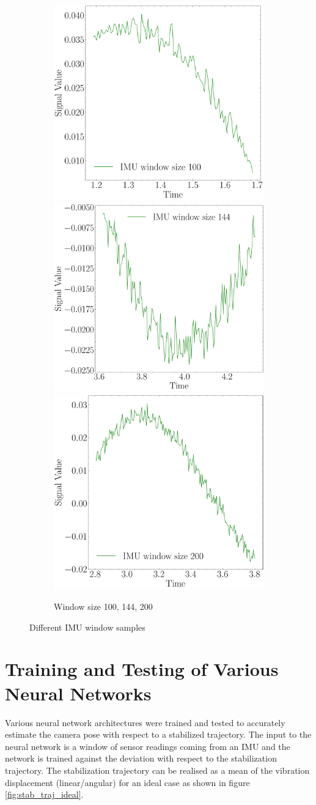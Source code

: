 \begin{figure}[H]
    \begin{subfigure}{\linewidth}
    \includegraphics[width=.3\linewidth]{images/fig_chapter4/imu_windows/imu_window_size_100.pdf}\hfill
    \includegraphics[width=.3\linewidth]{images/fig_chapter4/imu_windows/imu_window_size_144.pdf}\hfill
    \includegraphics[width=.3\linewidth]{images/fig_chapter4/imu_windows/imu_window_size_200.pdf}\hfill
    \caption{Window size 100, 144, 200}
    \end{subfigure}
\caption{Different IMU window samples}
\label{fig:imu_window_samples}
\end{figure}

\section{Training and Testing of Various Neural Networks}
Various neural network architectures were trained and tested to accurately estimate the camera pose with respect to a stabilized trajectory. The input to the neural network is a window of sensor readings coming from an IMU and the network is trained against the deviation with respect to the stabilization trajectory. The stabilization trajectory can be realised as a mean of the vibration displacement (linear/angular) for an ideal case as shown in figure \ref{fig:stab_traj_ideal}. 

